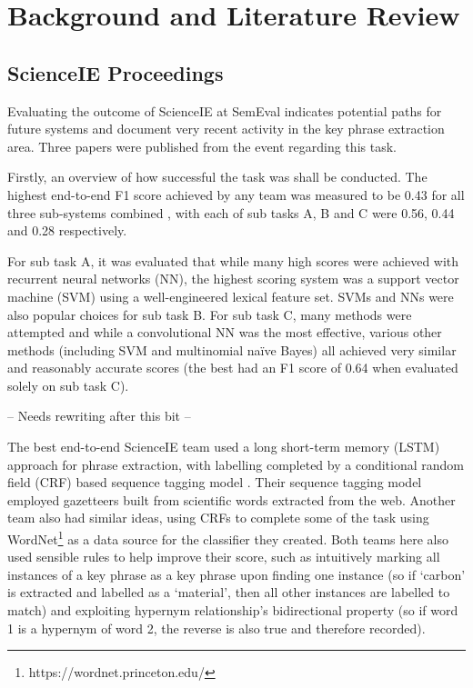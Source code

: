 \section{Background and Literature Review}

\subsection{ScienceIE Proceedings}
Evaluating the outcome of ScienceIE at SemEval indicates potential paths for future systems and document very recent activity in the key phrase extraction area. Three papers were published from the event regarding this task.

Firstly, an overview of how successful the task was shall be conducted. The highest end-to-end F1 score achieved by any team was measured to be 0.43 for all three sub-systems combined \cite{Augenstein2017}, with each of sub tasks A, B and C were 0.56, 0.44 and 0.28 respectively. 

For sub task A, it was evaluated that while many high scores were achieved with recurrent neural networks (NN), the highest scoring system was a support vector machine (SVM) using a well-engineered lexical feature set. SVMs and NNs were also popular choices for sub task B. For sub task C, many methods were attempted and while a convolutional NN was the most effective, various other methods (including SVM and multinomial naïve Bayes) all achieved very similar and reasonably accurate scores (the best had an F1 score of 0.64 when evaluated solely on sub task C).

-- Needs rewriting after this bit --

The best end-to-end ScienceIE team used a long short-term memory (LSTM) approach for phrase extraction, with labelling completed by a conditional random field (CRF) based sequence tagging model \cite{Ammar2017}. Their sequence tagging model employed gazetteers built from scientific words extracted from the web. Another team \cite{Marsi2017} also had similar ideas, using CRFs to complete some of the task using WordNet\footnote{https://wordnet.princeton.edu/} as a data source for the classifier they created. Both teams here also used sensible rules to help improve their score, such as intuitively marking all instances of a key phrase as a key phrase upon finding one instance (so if ‘carbon’ is extracted and labelled as a ‘material’, then all other instances are labelled to match) and exploiting hypernym relationship’s bidirectional property (so if word 1 is a hypernym of word 2, the reverse is also true and therefore recorded). 

